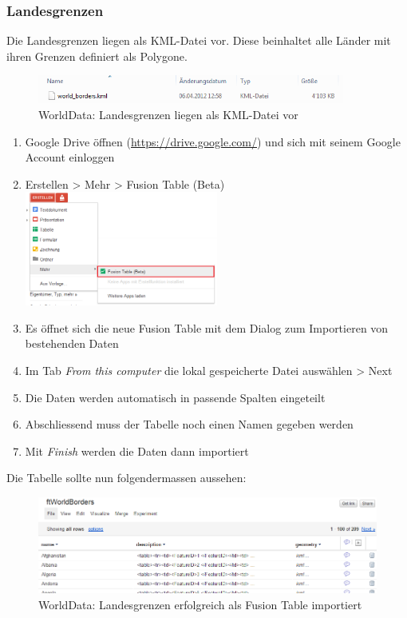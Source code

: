 \subsubsection{Landesgrenzen}
\label{landesgrenzen}
Die Landesgrenzen liegen als \gls{KML}-Datei vor. Diese beinhaltet alle Länder mit ihren Grenzen definiert als Polygone.

\begin{figure}[H]
	\centering
	\includegraphics[width=0.9\textwidth]{images/usecase1-worlddata/documentation/worlddata-worldborders_kml}
	\caption{WorldData: Landesgrenzen liegen als KML-Datei vor}
	\label{worlddata-worldborders_kml}
\end{figure}

\begin{enumerate}
\item Google Drive öffnen (\url{https://drive.google.com/}) und sich mit seinem Google Account einloggen
\item Erstellen > Mehr > Fusion Table (Beta) \\ \includegraphics[width=0.5\textwidth]{images/usecase1-worlddata/documentation/worlddata-worldborders_import1}
\item Es öffnet sich die neue Fusion Table mit dem Dialog zum Importieren von bestehenden Daten
\item Im Tab \emph{From this computer} die lokal gespeicherte Datei auswählen > Next
\item Die Daten werden automatisch in passende Spalten eingeteilt
\item Abschliessend muss der Tabelle noch einen Namen gegeben werden
\item Mit \emph{Finish} werden die Daten dann importiert
\end{enumerate}

Die Tabelle sollte nun folgendermassen aussehen:

\begin{figure}[H]
	\centering
	\includegraphics[width=\textwidth]{images/usecase1-worlddata/documentation/worlddata-worldborders_import_done}
	\caption{WorldData: Landesgrenzen erfolgreich als Fusion Table importiert}
	\label{worlddata-worldborders_import_done}
\end{figure}

